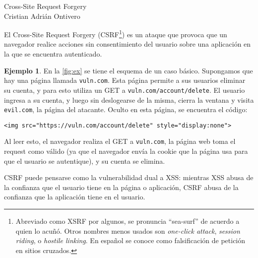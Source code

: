\documentclass{article}
\theoremstyle{definition}
\newtheorem{ex}{Ejemplo}
\begin{document}
\begin{center}
  {\LARGE Cross-Site Request Forgery}\\[.2cm]
  Cristian Adrián Ontivero \\[.05cm]%
  \isodate
\end{center}

\vspace{0.2 cm}
El Cross-Site Request Forgery (CSRF\footnote{Abreviado como XSRF por algunos, se
  pronuncia ``sea-surf'' de acuerdo a quien lo acuñó. Otros nombres menos usados
  son \textit{one-click attack}, \textit{session riding}, o \textit{hostile
linking}. En español se conoce como falsificación de petición en sitios
cruzados.}) es un ataque que provoca que un navegador realice acciones sin
consentimiento del usuario sobre una aplicación en la que se encuentra
autenticado.

\begin{ex}\label{ex:1}
  En la \autoref{fig:ex} se tiene el esquema de un caso básico. Supongamos que
  hay una página llamada \verb+vuln.com+. Esta página
  permite a sus usuarios eliminar su cuenta, y para esto utiliza un GET a
  \verb+vuln.com/account/delete+. El usuario ingresa a su cuenta, y luego sin
  deslogearse de la misma, cierra la ventana y visita \verb+evil.com+, la página
  del atacante. Oculto en esta página, se encuentra el código: 

  \begin{center}
\verb+<img src="https://vuln.com/account/delete" style="display:none">+
  \end{center}

 Al leer  esto, el navegador realiza el GET a \verb+vuln.com+, la página web
 toma el request como válido (ya que el navegador envía la cookie que la página
 usa para que el usuario se autentique), y su cuenta se elimina.
\end{ex}



CSRF puede pensarse como la vulnerabilidad dual a XSS: mientras XSS abusa de la
confianza que el usuario tiene en la página o aplicación, CSRF abusa de la
confianza que la aplicación tiene en el usuario.
\end{document}
